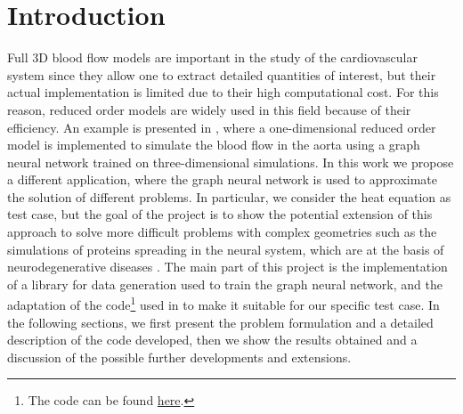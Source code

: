 \documentclass[11pt,a4paper]{article}
\begin{document}




\section{Introduction}
Full 3D blood flow models are important in the study of the cardiovascular system since they allow one to extract detailed quantities of interest, but their actual implementation is limited due to their high computational cost. For this reason, reduced order models are widely used in this field because of their efficiency. An example is presented in \cite{Luca}, where a one-dimensional reduced order model is implemented to simulate the blood flow in the aorta using a graph neural network trained on three-dimensional simulations. In this work we propose a different application, where the graph neural network is used to approximate the solution of different problems. In particular, we consider the heat equation as test case, but the goal of the project is to show the potential extension of this approach to solve more difficult problems with complex geometries such as the simulations of proteins spreading in the neural system, which are at the basis of neurodegenerative diseases \cite{MattiaCorti}. The main part of this project is the implementation of a library for data generation used to train the graph neural network, and the adaptation of the code\footnote{The code can be found \href{https://github.com/StanfordCBCL/gROM}{here}.} used in \cite{Luca} to make it suitable for our specific test case. In the following sections, we first present the problem formulation and a detailed description of the code developed, then we show the results obtained and a discussion of the possible further developments and extensions.

\end{document}
